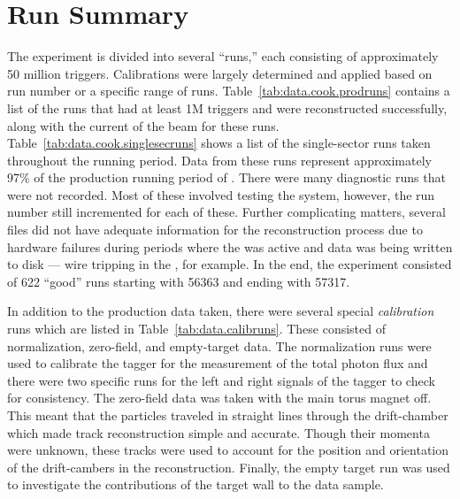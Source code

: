 \section{\label{sec:data.runsum}Run Summary}

The  experiment is divided into several ``runs,'' each consisting of approximately 50 million triggers. Calibrations were largely determined and applied based on run number or a specific range of runs. Table~\ref{tab:data.cook.prodruns} contains a list of the runs that had at least 1M triggers and were reconstructed successfully, along with the current of the beam for these runs. Table~\ref{tab:data.cook.singlesecruns} shows a list of the single-sector runs taken throughout the  running period. Data from these runs represent approximately 97\% of the production running period of . There were many diagnostic runs that were not recorded. Most of these involved testing the  system, however, the run number still incremented for each of these. Further complicating matters, several files did not have adequate information for the reconstruction process due to hardware failures during periods where the  was active and data was being written to disk --- wire tripping in the , for example. In the end, the  experiment consisted of 622 ``good'' runs starting with 56363 and ending with 57317.



In addition to the production data taken, there were several special \emph{calibration} runs which are listed in Table~\ref{tab:data.calibruns}. These consisted of normalization, zero-field, and empty-target data. The normalization runs were used to calibrate the tagger for the measurement of the total photon flux and there were two specific runs for the left and right  signals of the tagger to check for consistency. The zero-field data was taken with the main torus magnet off. This meant that the particles traveled in straight lines through the drift-chamber which made track reconstruction simple and accurate. Though their momenta were unknown, these tracks were used to account for the position and orientation of the drift-cambers in the reconstruction. Finally, the empty target run was used to investigate the contributions of the target wall to the data sample.

